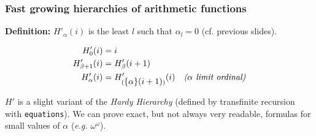\documentclass[10pt, fleqn]{beamer}
\begin{document}
\begin{frame}
  \frametitle{Fast growing hierarchies of arithmetic functions}




\textbf{Definition: }
  \textcolor{mathcolor}{$H'_\alpha(i)$} is the least $l$ such that \textcolor{mathcolor}{$\alpha_l=0$} (cf. previous slides). 

 
 {\color{mathcolor}
\begin{align}
  H'_0(i) & = i\\
  H'_{\beta+1}(i) &=H'_\beta(i+1) \\
  H'_\alpha(i) &= H'_{(\mbox{$\{\alpha\}(i+1)$})}(i)  \quad\textit{($\alpha$ limit ordinal)} 
\end{align}}


\textcolor{mathcolor}{$H'$} is a slight variant of the \emph{Hardy Hierarchy} (defined by transfinite recursion with \texttt{equations}).
 We can prove exact, but not always very readable, formulas for small values of \textcolor{mathcolor}{$\alpha$} (\emph{e.g.} \textcolor{mathcolor}{$\omega^\omega$}).

  




\end{frame}



 
\end{document}
